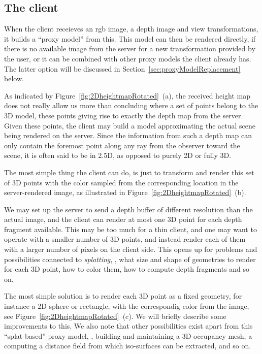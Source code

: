 \subsection{The client}

When the client receieves an rgb image, a depth image and view transformations,
it builds a ``proxy model'' from this. This model can then be rendered directly,
if there is no available image from the server for a new transformation provided
by the user, or it can be combined with other proxy models the client already
has. The latter option will be discussed in
Section~\ref{sec:proxyModelReplacement} below.



As indicated by Figure~\ref{fig:2DheightmapRotated}~(a), the received
height map does not really allow us more than concluding where a set of points
belong to the 3D model, these points giving rise to exactly the depth map from
the server. Given these points, the client may build a model approximating the
actual scene being rendered on the server. Since the information from such a
depth map can only contain the foremost point along any ray from the observer
toward the scene, it is often said to be in 2.5D, as opposed to purely 2D or
fully 3D.

The most simple thing the client can do, is just to transform and render this
set of 3D points with the color sampled from the corresponding location in the
server-rendered image, as illustrated in
Figure~\ref{fig:2DheightmapRotated}~(b).

We may set up the server to send a depth buffer of different resolution than the
actual image, and the client can render at most one 3D point for each depth
fragment available. This may be too much for a thin client, and one may want to
operate with a smaller number of 3D points, and instead render each of them with
a larger number of pixels on the client side. This opens up for problems and
possibilities connected to {\em splatting}, \eg, what size and shape of
geometries to render for each 3D point, how to color them, how to compute depth
fragments and so on.

The most simple solution is to render each 3D point as a fixed geometry, for
instance a 2D sphere or rectangle, with the correspondig color from the image,
see Figure~\ref{fig:2DheightmapRotated}~(c). We will briefly describe some
improvements to this. We also note that other possibilities exist apart
from this ``splat-based'' proxy model, \eg, building and maintaining a 3D
occupancy mesh, a computing a distance field from which iso-surfaces can be
extracted, and so on.

